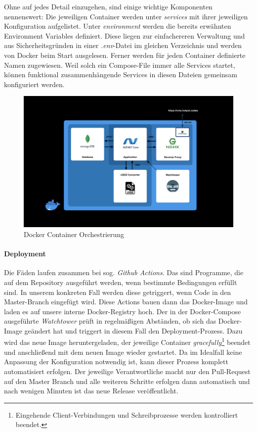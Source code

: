 \documentclass[titlepage, a4paper, 11pt]{scrartcl}
\begin{document}
          Ohne auf jedes Detail einzugehen, sind einige wichtige Komponenten nennenswert: Die jeweiligen Container werden unter \textit{services} mit ihrer jeweiligen Konfiguration aufgelistet.
          Unter \textit{environment} werden die bereits erwähnten Environment Variables definiert. Diese liegen zur einfachereren Verwaltung und aus Sicherheitsgründen in einer \textit{.env}-Datei
          im gleichen Verzeichnis und werden von Docker beim Start ausgelesen. Ferner werden für jeden Container definierte Namen zugewiesen. Weil solch ein Compose-File immer alle Services startet,
          können funktional zusammenhängende Services in diesen Dateien gemeinsam konfiguriert werden.

          \begin{figure}[H]
            \centering
            \includegraphics[width=.8\textwidth]{DCompose.png}
            \caption{Docker Container Orchestrierung}
            \label{pipeline}
          \end{figure}

        \paragraph{Deployment}        

          Die Fäden laufen zusammen bei sog. \textit{Github Actions}. Das sind Programme, die auf dem Repository ausgeführt werden, wenn bestimmte Bedingungen erfüllt sind.
          In unserem konkreten Fall werden diese getriggert, wenn Code in den Master-Branch eingefügt wird. Diese Actions bauen dann das Docker-Image und laden es auf unsere interne
          Docker-Registry hoch. Der in der Docker-Compose ausgeführte \textit{Watchtower} prüft in regelmäßigen Abständen, ob sich das Docker-Image geändert hat und triggert in diesem Fall
          den Deployment-Prozess. Dazu wird das neue Image heruntergeladen, der jeweilige Container \textit{gracefully}\footnote{Eingehende Client-Verbindungen und Schreibprozesse werden kontrolliert beendet.} 
          beendet und anschließend mit dem neuen Image wieder gestartet. Da im Idealfall keine Anpassung der Konfiguration notwendig ist, kann dieser Prozess komplett automatisiert erfolgen.
          Der jeweilige Verantwortliche macht nur den Pull-Request auf den Master Branch und alle weiteren Schritte erfolgen dann automatisch und nach wenigen Minuten ist das neue Release veröffentlicht.
\end{document}
